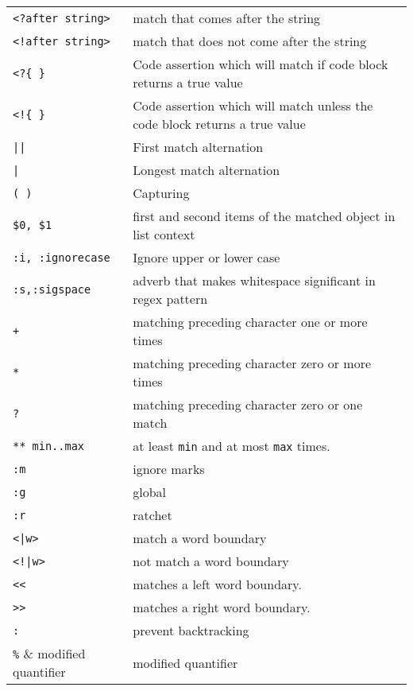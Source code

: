 \documentclass[12pt]{article}
\begin{document}
\begin{longtable}{lp{12cm}}
		\verb|<?after string>|	& match that comes after the string\\
		\verb|<!after string>|	& match that does not come after the string\\
		\verb|<?{ }|	& Code assertion which will match if code block returns a true value\\
		\verb|<!{ }|	& Code assertion which will match unless the code block returns a true value\\
		\verb!||!	& First match alternation\\
		\verb!|!	& Longest match alternation\\
		\verb|( )|	& Capturing\\
		\verb|$0, $1|	& first and second items of the matched object in list context\\
		\verb|:i, :ignorecase|	& Ignore upper or lower case\\
		\verb|:s,:sigspace|	& adverb that makes whitespace significant in regex pattern\\
		
		\verb|+|	& matching preceding character one or more times\\
		\verb|*|	& matching preceding character zero or more times\\
		\verb|?|	& matching preceding character zero or one match\\
		\verb|** min..max|	& at least \verb|min| and at most \verb|max| times.\\		
		\verb|:m|   & ignore marks\\
		\verb|:g|   & global\\
		\verb|:r|   & ratchet\\
		\verb!<|w>! & match a word boundary\\
		\texttt{<!|w>} & not match a word boundary\\
		\verb|<<| & matches a left word boundary.\\
		\verb|>>| & matches a right word boundary.\\
		\verb|:| & prevent backtracking\\
		\verb|%| & modified quantifier\\
		
	\end{longtable}
\end{document}
